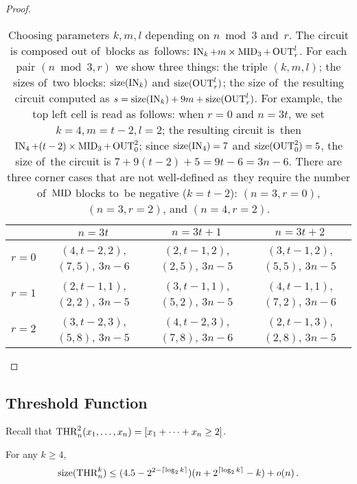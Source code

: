 \begin{proof}
\begin{table}[!ht]
\begin{center}
\begin{tabular}{cccc}
\toprule
& $n=3t$ & $n=3t+1$ & $n=3t+2$\\
\midrule
$r=0$
& $(4, t-2, 2)$, $(7, 5)$, $3n-6$
& $(2, t-1, 2)$, $(2, 5)$, $3n-5$
& $(3, t-1, 2)$, $(5, 5)$, $3n-5$
\\
$r=1$
& $(2, t-1, 1)$, $(2, 2)$, $3n-5$
& $(3, t-1, 1)$, $(5, 2)$, $3n-5$
& $(4, t-1, 1)$, $(7, 2)$, $3n-6$
\\
$r=2$
& $(3, t-2, 3)$, $(5, 8)$, $3n-5$
& $(4, t-2, 3)$, $(7, 8)$, $3n-6$
& $(2, t-1, 3)$, $(2, 8)$, $3n-5$
\\
\bottomrule
\end{tabular}
\end{center}
\caption{Choosing parameters $k, m, l$ depending on $n \bmod 3$ and~$r$. The circuit is composed out of~blocks
as~follows: $\operatorname{IN}_k + m \times \operatorname{MID}_3 + \operatorname{OUT}_r^l$. For each
pair $(n \bmod 3, r)$ we show three things: the triple
$(k, m, l)$; the sizes of~two blocks: $\operatorname{size}(\operatorname{IN}_k)$ and $\operatorname{size}(\operatorname{OUT}_r^l)$; the size of~the resulting circuit
computed as $s=\operatorname{size}(\operatorname{IN}_k)+9m+\operatorname{size}(\operatorname{OUT}_r^l)$. For example, the top left cell is read as follows: when $r=0$ and $n=3t$, we set $k=4,m=t-2,l=2$; the resulting circuit
is~then $\operatorname{IN}_4 + (t-2) \times \operatorname{MID}_3 + \operatorname{OUT}_0^2$; since $\operatorname{size}(\operatorname{IN}_4)=7$ and $\operatorname{size}(\operatorname{OUT}_0^2)=5$, the size of~the circuit is $7+9(t-2)+5=9t-6=3n-6$.
There are three corner cases that are not well-defined as~they require the
number of~$\operatorname{MID}$ blocks to~be negative ($k=t-2$): $(n=3,r=0)$, $(n=3,r=2)$, and $(n=4, r=2)$.}
\label{table:parameters}
\end{table}
\end{proof}

\subsection{Threshold Function}
Recall that $\operatorname{THR}_n^2(x_1, \dotsc, x_n)=[x_1+\dotsb+x_n \ge 2]$.
\begin{theorem}
    For any $k \ge 4$,
    \[
        \operatorname{size}(\operatorname{THR}_n^k) \le (4.5-2^{2-{{\lceil \log_2k \rceil}}})(n+2^{\lceil \log_2k \rceil}-k)+o(n) \, .
    \]
\end{theorem}

